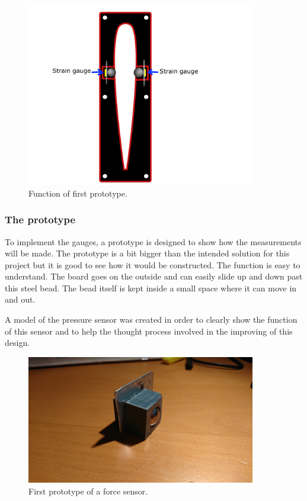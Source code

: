 \begin{figure}[H]
\begin{center}
	\includegraphics[width = 10cm]{Figures/Prototyp_1.png}
	\caption{Function of first prototype.}
	\label{Press_sens_impl}
\end{center}
\end{figure}

\subsubsection{The prototype}
To implement the gauges, a prototype is designed to show how the measurements will be made. The prototype is a bit bigger than the intended solution for this project but it is good to see how it would be constructed. The function is easy to understand. The board goes on the outside and can easily slide up and down past this steel bead. The bead itself is kept inside a small space where it can move in and out.

A model of the pressure sensor was created in order to clearly show the function of this sensor and to help the thought process involved in the improving of this design.

\begin{figure}[H]
\begin{center}
	\includegraphics[width = 10cm]{Figures/Press_sens_prot_1.png}
	\caption{First prototype of a force sensor.}
	\label{Press_sens_prot_1}
\end{center}
\end{figure}

